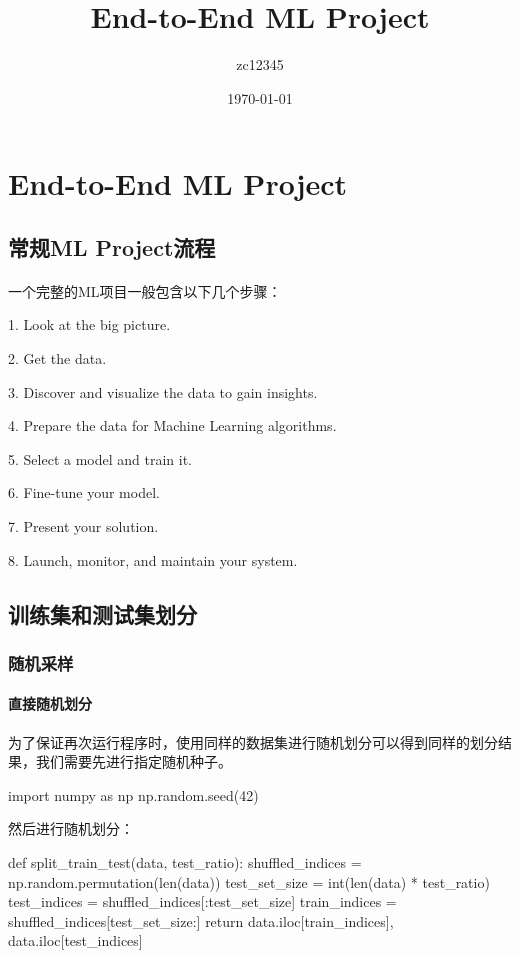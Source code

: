 \documentclass[UTF8]{ctexart}
\begin{document}
\title{End-to-End ML Project}
\author{zc12345}
\date\today
\maketitle
\tableofcontents
\else
\section{End-to-End ML Project}
\fi
\subsection{常规ML Project流程}
\paragraph{}
一个完整的ML项目一般包含以下几个步骤：\par
1. Look at the big picture.\par
2. Get the data.\par
3. Discover and visualize the data to gain insights.\par
4. Prepare the data for Machine Learning algorithms.\par
5. Select a model and train it.\par
6. Fine-tune your model.\par
7. Present your solution.\par
8. Launch, monitor, and maintain your system.\par

\subsection{训练集和测试集划分}
\subsubsection{随机采样}

\paragraph{直接随机划分}
为了保证再次运行程序时，使用同样的数据集进行随机划分可以得到同样的划分结果，我们需要先进行指定随机种子。
\begin{python}
    import numpy as np
    np.random.seed(42)
\end{python}
然后进行随机划分：
\begin{python}
    def split_train_test(data, test_ratio):
        shuffled_indices = np.random.permutation(len(data))
        test_set_size = int(len(data) * test_ratio)
        test_indices = shuffled_indices[:test_set_size]
        train_indices = shuffled_indices[test_set_size:]
        return data.iloc[train_indices], data.iloc[test_indices]
\end{python}
\end{document}
